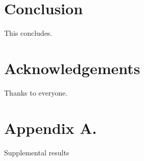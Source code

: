 \documentclass[twoside,11pt]{article}
\begin{document}
\section{Conclusion}
This concludes.


\section{Acknowledgements}
Thanks to everyone.






\newpage

\appendix
\section*{Appendix A.}
\label{app:theorem}

Supplemental results
\end{document}
